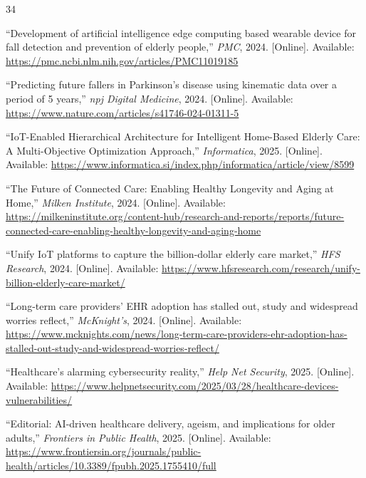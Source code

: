 \documentclass[conference]{IEEEtran}
\begin{document}

\begin{thebibliography}{34}

``Development of artificial intelligence edge computing based wearable device for fall detection and prevention of elderly people,'' \textit{PMC}, 2024. [Online]. Available: \url{https://pmc.ncbi.nlm.nih.gov/articles/PMC11019185}

``Predicting future fallers in Parkinson's disease using kinematic data over a period of 5 years,'' \textit{npj Digital Medicine}, 2024. [Online]. Available: \url{https://www.nature.com/articles/s41746-024-01311-5}

``IoT-Enabled Hierarchical Architecture for Intelligent Home-Based Elderly Care: A Multi-Objective Optimization Approach,'' \textit{Informatica}, 2025. [Online]. Available: \url{https://www.informatica.si/index.php/informatica/article/view/8599}

``The Future of Connected Care: Enabling Healthy Longevity and Aging at Home,'' \textit{Milken Institute}, 2024. [Online]. Available: \url{https://milkeninstitute.org/content-hub/research-and-reports/reports/future-connected-care-enabling-healthy-longevity-and-aging-home}

``Unify IoT platforms to capture the billion-dollar elderly care market,'' \textit{HFS Research}, 2024. [Online]. Available: \url{https://www.hfsresearch.com/research/unify-billion-elderly-care-market/}

``Long-term care providers' EHR adoption has stalled out, study and widespread worries reflect,'' \textit{McKnight's}, 2024. [Online]. Available: \url{https://www.mcknights.com/news/long-term-care-providers-ehr-adoption-has-stalled-out-study-and-widespread-worries-reflect/}

``Healthcare's alarming cybersecurity reality,'' \textit{Help Net Security}, 2025. [Online]. Available: \url{https://www.helpnetsecurity.com/2025/03/28/healthcare-devices-vulnerabilities/}

``Editorial: AI-driven healthcare delivery, ageism, and implications for older adults,'' \textit{Frontiers in Public Health}, 2025. [Online]. Available: \url{https://www.frontiersin.org/journals/public-health/articles/10.3389/fpubh.2025.1755410/full}


\end{thebibliography}
\end{document}

